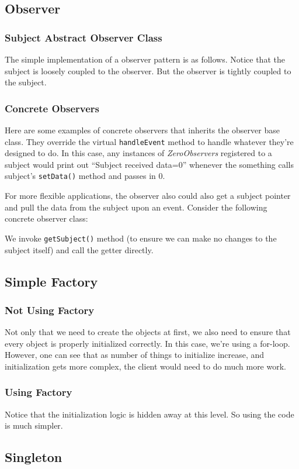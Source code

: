 \subsection{Observer}\label{code:observer}
\subsubsection{Subject Abstract Observer Class}
The simple implementation of a observer pattern is as follows. Notice that the subject is loosely coupled to the observer. But the observer is tightly coupled to the subject.

\subsubsection{Concrete Observers}
Here are some examples of concrete observers that inherits the observer base class. They override the virtual \texttt{handleEvent} method to handle whatever they're designed to do. In this case, any instances of \textit{ZeroObservers} registered to a subject would print out ``Subject received data=0'' whenever the something calls subject's \texttt{setData()} method and passes in 0.

For more flexible applications, the observer also could also get a subject pointer and pull the data from the subject upon an event. Consider the following concrete observer class:

We invoke \texttt{getSubject()} method (to ensure we can make no changes to the subject itself) and call the getter directly.



\subsection{Simple Factory}
\label{code:simple-factory}
\subsubsection{Not Using Factory}
Not only that we need to create the objects at first, we also need to ensure that every object is properly initialized correctly. In this case, we're using a for-loop. However, one can see that as number of things to initialize increase, and initialization gets more complex, the client would need to do much more work.

\subsubsection{Using Factory}
Notice that the initialization logic is hidden away at this level. So using the code is much simpler.


\subsection{Singleton}
\label{code:singleton}